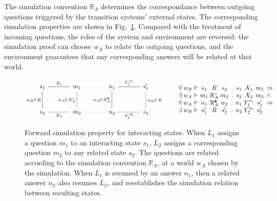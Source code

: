 \documentclass[acmsmall,authordraft]{acmart}
\newcommand{\que}{\circ}
\newcommand{\ans}{\bullet}
\begin{document}
The simulation convention $\mathbb{R}_A$
determines the correspondance between
outgoing questions triggered by
the transition systems' external states.
The corresponding simulation properties
are shown in Fig.~\ref{fig:fsim-ext}.
Compared with the treatment of incoming questions,
the roles of the system and environment are reversed:
the simulation proof can choose $w_A$
to relate the outgoing questions,
and the environment guarantees that any corresponding answers
will be related at that world.

\begin{figure} %
  \[
      \begin{tikzcd}[sep=large,baseline=-3pt]
        s_1 \ar[r, "X_1", dash] \ar[d, "w_B \Vdash R"', dash] &
        m_1 \ar[r, dotted, dash] \ar[d, "w_A \Vdash \mathbb{R}_A^\que"', dash, dashed] &
        n_1 \ar[r, "Y_1^{s_1}", dash] \ar[d, "w_A \Vdash \mathbb{R}_A^\ans"', dash] &
        s_1' \ar[d, "w_B \Vdash R", dash, dashed]
        \\
        s_2 \ar[r, "X_2"', dash, dashed] &
        m_2 \ar[r, dotted, dash] &
        n_2 \ar[r, "Y_2^{s_2}"', dash, dashed] &
        s_2
      \end{tikzcd}
      \qquad
      \begin{array}{
          c @{\:} l @{{} \Vdash {}} c@{}c@{}c @{\:\:.\:\:}
                                    c@{}c@{}c @{\:\:} l}
        \forall & w_B & s_1 & {}\mathrel{R}{} & s_2 &
                        s_1 & {}\mathrel{X_1}{} & m_1 & \Rightarrow \\
        \exists & w_A & m_1 & {}\mathrel{\mathbb{R}_A^\que}{} & m_2 &
                        s_2 & {}\mathrel{X_2}{} & m_2 & \wedge \\
        \forall & w_A & n_1 & {}\mathrel{\mathbb{R}_A^\ans}{} & n_2 &
                        n_1 & {}\mathrel{Y_1^{s_1}}{} & s_1' & \Rightarrow \\
        \exists & w_B & s_1' & {}\mathrel{R}{} & s_2' &
                        n_2 & {}\mathrel{Y_2^{s_2}}{} & s_2' &
      \end{array}
      \quad
  \]
  \caption{Forward simulation property for interacting states.
    When $L_1$ assigns a question $m_1$ to an interacting state $s_1$,
    $L_2$ assigns a corresponding question $m_2$ to any related state $s_2$.
    The questions are related according to
    the simulation convention $\mathbb{R}_A$,
    at a world $w_A$ chosen by the simulation.
    When $L_1$ is resumed by an answer $n_1$,
    then a related answer $n_2$ also resumes $L_2$,
    and reestablishes the simulation relation
    between resulting states.}
  \label{fig:fsim-ext}
\end{figure}
\end{document}
